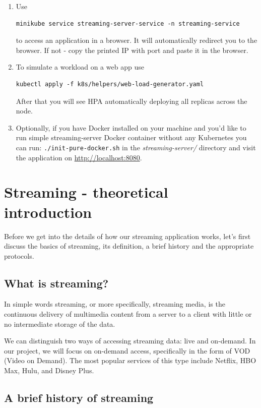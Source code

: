 \documentclass{article}
\begin{document}
\begin{enumerate}
    \item Use 
    \begin{verbatim}minikube service streaming-server-service -n streaming-service \end{verbatim}
      to access an application in a browser. It will automatically redirect
      you to the browser. If not - copy the printed IP with port and paste
      it in the browser.
    \item
      To simulate a workload on a web app use
      \begin{verbatim}kubectl apply -f k8s/helpers/web-load-generator.yaml\end{verbatim}
      After that you will see HPA automatically deploying all replicas
      across the node.
    \item
      Optionally, if you have Docker installed on your machine and you'd
      like to run simple streaming-server Docker container without any
      Kubernetes you can run: \texttt{./init-pure-docker.sh} in the
      \emph{streaming-server/} directory and visit the application on
      \href{http://localhost:8080}{http://localhost:8080}.
\end{enumerate}

\section{Streaming - theoretical
introduction}\label{streaming---theoretical-introduction}

Before we get into the details of how our streaming application works,
let's first discuss the basics of streaming, its definition, a brief
history and the appropriate protocols.

\subsection{What is streaming?}\label{what-is-streaming}

In simple words streaming, or more specifically, streaming media, is the continuous delivery of multimedia
content from a server to a client with little or no intermediate storage of the data.

We can distinguish two ways of accessing streaming data: live and
on-demand. In our project, we will focus on on-demand access,
specifically in the form of VOD (Video on Demand). 
The most popular services of this type include Netflix, HBO Max, Hulu, and Disney Plus.

\subsection{A brief history of
streaming}\label{a-brief-history-of-streaming}
\end{document}
